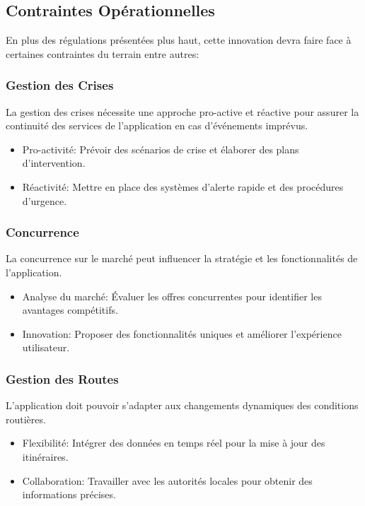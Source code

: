 \documentclass{article}
\begin{document}
\subsection{Contraintes Opérationnelles}

En plus des régulations présentées plus haut, cette innovation devra faire face à certaines contraintes du terrain entre autres:

\subsubsection*{Gestion des Crises}
La gestion des crises nécessite une approche pro-active et réactive pour assurer la continuité des services de l'application en cas d'événements imprévus.

\begin{itemize}
    \item Pro-activité: Prévoir des scénarios de crise et élaborer des plans d'intervention.
    \item Réactivité: Mettre en place des systèmes d'alerte rapide et des procédures d'urgence.
\end{itemize}

\subsubsection*{Concurrence}
La concurrence sur le marché peut influencer la stratégie et les fonctionnalités de l'application.
\begin{itemize}
    \item Analyse du marché: Évaluer les offres concurrentes pour identifier les avantages compétitifs.
    \item Innovation: Proposer des fonctionnalités uniques et améliorer l'expérience utilisateur.
\end{itemize}

\subsubsection*{Gestion des Routes}
L'application doit pouvoir s'adapter aux changements dynamiques des conditions routières.
\begin{itemize}
    \item Flexibilité: Intégrer des données en temps réel pour la mise à jour des itinéraires.
    \item Collaboration: Travailler avec les autorités locales pour obtenir des informations précises.
\end{itemize}
\end{document}
